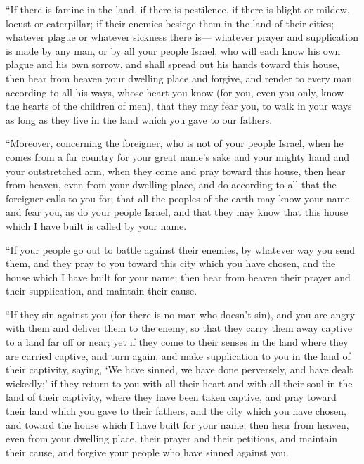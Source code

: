  ``If there is famine in the land, if there is
pestilence, if there is blight or mildew, locust or caterpillar; if
their enemies besiege them in the land of their cities; whatever plague
or whatever sickness there is---  whatever prayer and
supplication is made by any man, or by all your people Israel, who will
each know his own plague and his own sorrow, and shall spread out his
hands toward this house,  then hear from heaven your
dwelling place and forgive, and render to every man according to all his
ways, whose heart you know (for you, even you only, know the hearts of
the children of men),  that they may fear you, to walk in
your ways as long as they live in the land which you gave to our
fathers.

 ``Moreover, concerning the foreigner, who is not of your
people Israel, when he comes from a far country for your great name's
sake and your mighty hand and your outstretched arm, when they come and
pray toward this house,  then hear from heaven, even from
your dwelling place, and do according to all that the foreigner calls to
you for; that all the peoples of the earth may know your name and fear
you, as do your people Israel, and that they may know that this house
which I have built is called by your name.

 ``If your people go out to battle against their enemies,
by whatever way you send them, and they pray to you toward this city
which you have chosen, and the house which I have built for your name;
 then hear from heaven their prayer and their
supplication, and maintain their cause.

 ``If they sin against you (for there is no man who
doesn't sin), and you are angry with them and deliver them to the enemy,
so that they carry them away captive to a land far off or near;
 yet if they come to their senses in the land where they
are carried captive, and turn again, and make supplication to you in the
land of their captivity, saying, `We have sinned, we have done
perversely, and have dealt wickedly;'  if they return to
you with all their heart and with all their soul in the land of their
captivity, where they have been taken captive, and pray toward their
land which you gave to their fathers, and the city which you have
chosen, and toward the house which I have built for your name;
 then hear from heaven, even from your dwelling place,
their prayer and their petitions, and maintain their cause, and forgive
your people who have sinned against you.

